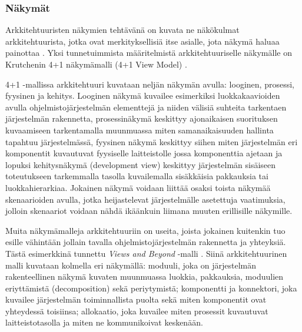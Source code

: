 \documentclass[finnish]{tktltiki2}
\theoremstyle{definition}
\theoremstyle{remark}
\begin{document}
\subsubsection{Näkymät}
Arkkitehtuuristen näkymien tehtävänä on kuvata ne näkökulmat arkkitehtuurista, jotka ovat merkityksellisiä itse asialle, jota näkymä haluaa painottaa \citetext{\citealp[s. 34]{Rozanski:2011:SSA:2072649}; \citealp[s. 15]{may2005survey}}. Yksi tunnetuimmista määritelmistä arkkitehtuuriselle näkymälle on Krutchenin 4+1 näkymämalli (4+1 View Model) \citep[s.7-8]{gorton_understanding_2011}. 

4+1 -mallissa arkkitehtuuri kuvataan neljän näkymän avulla: looginen, prosessi, fyysinen ja kehitys. Looginen näkymä kuvailee esimerkiksi luokkakaavioiden avulla ohjelmistojärjestelmän elementtejä ja niiden välisiä suhteita tarkentaen järjestelmän rakennetta, prosessinäkymä keskittyy ajonaikaisen suorituksen kuvaamiseen tarkentamalla muunmuassa miten samanaikaisuuden hallinta tapahtuu järjestelmässä, fyysinen näkymä keskittyy siihen miten järjestelmän eri komponentit kuvautuvat fyysiselle laitteistolle jossa komponenttia ajetaan ja lopuksi kehitysnäkymä (development view) keskittyy järjestelmän sisäiseen toteutukseen tarkemmalla tasolla kuvailemalla sisäkkäisia pakkauksia tai luokkahierarkiaa. Jokainen näkymä voidaan liittää osaksi toista näkymää skenaarioiden avulla, jotka heijastelevat järjestelmälle asetettuja vaatimuksia, jolloin skenaariot voidaan nähdä ikäänkuin liimana muuten erillisille näkymille. 

Muita näkymämalleja arkkitehtuuriin on useita, joista jokainen kuitenkin tuo esille vähintään jollain tavalla ohjelmistojärjestelmän rakennetta ja yhteyksiä. Tästä esimerkkinä tunnettu \textit{Views and Beyond} -malli \citep[s.8]{gorton_understanding_2011}. Siinä arkkitehtuurinen malli kuvataan kolmella eri näkymällä: moduuli, joka on järjestelmän rakenteellinen näkymä kuvaten muunmuassa luokkia, pakkauksia, moduulien eriyttämistä (decomposition) sekä periytymistä; komponentti ja konnektori, joka kuvailee järjestelmän toiminnallista puolta sekä miten komponentit ovat yhteydessä toisiinsa; allokaatio, joka kuvailee miten prosessit kuvautuvat laitteistotasolla  ja miten ne kommunikoivat keskenään. 
\end{document}
